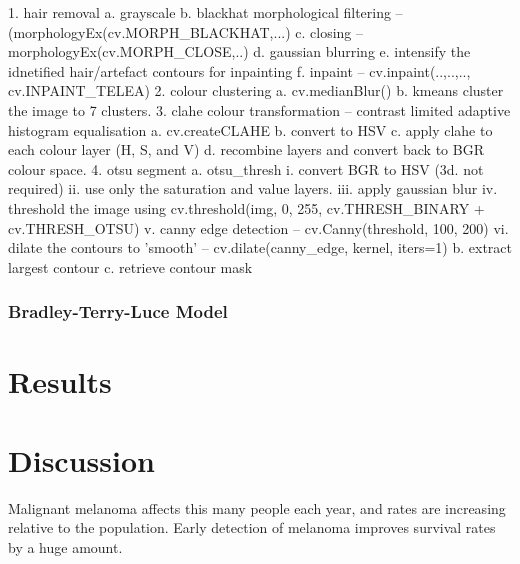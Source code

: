 \documentclass[a4paper, natbib, doc, 12pt]{apa7}
\begin{document}
1. hair removal
    a. grayscale
    b. blackhat morphological filtering -- (morphologyEx(cv.MORPH_BLACKHAT,...)
    c. closing -- morphologyEx(cv.MORPH_CLOSE,..)
    d. gaussian blurring
    e. intensify the idnetified hair/artefact contours for inpainting
    f. inpaint -- cv.inpaint(..,..,.., cv.INPAINT_TELEA)
2. colour clustering
    a. cv.medianBlur()
    b. kmeans cluster the image to 7 clusters.
3. clahe colour transformation -- contrast limited adaptive histogram equalisation
    a.  cv.createCLAHE
    b. convert to HSV
    c. apply clahe to each colour layer (H, S, and V)
    d. recombine layers and convert back to BGR colour space.
4. otsu segment
    a. otsu_thresh
        i. convert BGR to HSV (3d. not required)
        ii. use only the saturation and value layers.
        iii. apply gaussian blur
        iv. threshold the image using cv.threshold(img, 0, 255, cv.THRESH_BINARY + cv.THRESH_OTSU)
        v. canny edge detection -- cv.Canny(threshold, 100, 200)
        vi. dilate the contours to 'smooth' -- cv.dilate(canny_edge, kernel, iters=1)
    b. extract largest contour
    c. retrieve contour mask

\subsubsection{Bradley-Terry-Luce Model}%
\label{ssub:Bradley-Terry-Luce Model}


\section{Results}


\section{Discussion}

































Malignant melanoma affects this many people each year, and rates are increasing relative to the population. Early detection of melanoma improves survival rates by a huge amount.
\end{document}
